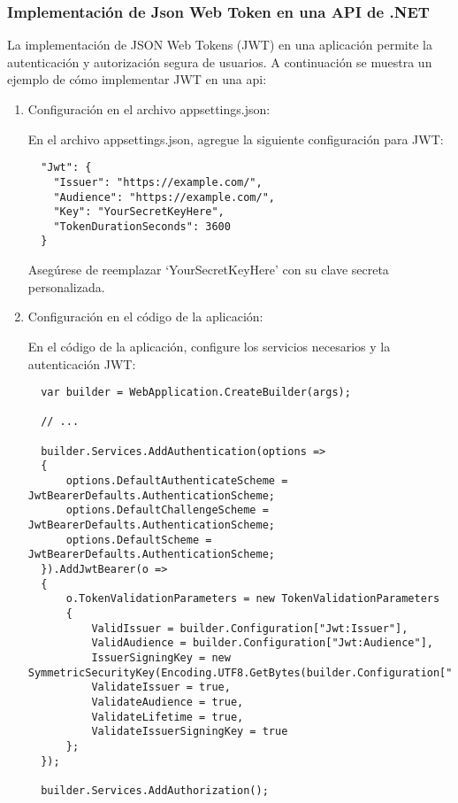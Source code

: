 \documentclass[executivepaper]{article}
\begin{document}
\subsubsection{Implementación de Json Web Token en una API de .NET}

La implementación de JSON Web Tokens (JWT) en una aplicación permite la autenticación y autorización segura de usuarios. A continuación se muestra un ejemplo de cómo implementar JWT en una api:

\begin{enumerate}
  \item Configuración en el archivo appsettings.json:

  En el archivo appsettings.json, agregue la siguiente configuración para JWT:

  \begin{lstlisting}
  "Jwt": {
    "Issuer": "https://example.com/",
    "Audience": "https://example.com/",
    "Key": "YourSecretKeyHere",
    "TokenDurationSeconds": 3600
  }
\end{lstlisting}

  Asegúrese de reemplazar \enquote*{YourSecretKeyHere} con su clave secreta personalizada.

  \item Configuración en el código de la aplicación:

  En el código de la aplicación, configure los servicios necesarios y la autenticación JWT:

  \begin{lstlisting}
  var builder = WebApplication.CreateBuilder(args);

  // ...

  builder.Services.AddAuthentication(options =>
  {
      options.DefaultAuthenticateScheme = JwtBearerDefaults.AuthenticationScheme;
      options.DefaultChallengeScheme = JwtBearerDefaults.AuthenticationScheme;
      options.DefaultScheme = JwtBearerDefaults.AuthenticationScheme;
  }).AddJwtBearer(o =>
  {
      o.TokenValidationParameters = new TokenValidationParameters
      {
          ValidIssuer = builder.Configuration["Jwt:Issuer"],
          ValidAudience = builder.Configuration["Jwt:Audience"],
          IssuerSigningKey = new SymmetricSecurityKey(Encoding.UTF8.GetBytes(builder.Configuration["Jwt:Key"])),
          ValidateIssuer = true,
          ValidateAudience = true,
          ValidateLifetime = true,
          ValidateIssuerSigningKey = true
      };
  });

  builder.Services.AddAuthorization();


\end{lstlisting}
\end{enumerate}
\end{document}
